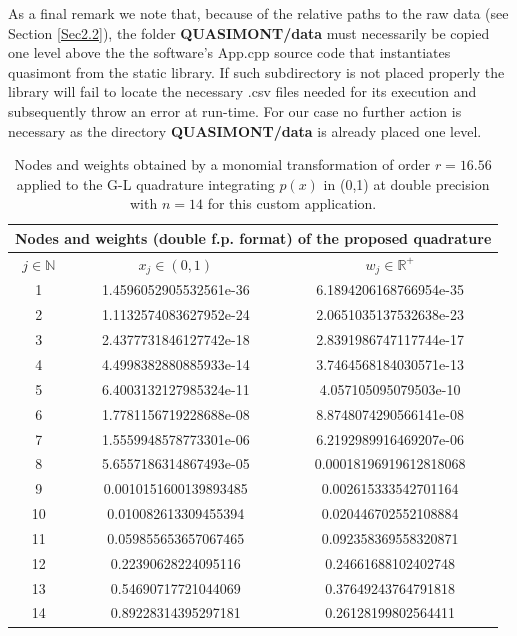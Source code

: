 \documentclass[a4paper, twosided]{book}
\begin{document}
\noindent
As a final remark we note that, because of the relative paths to the raw data (see Section \ref{Sec2.2}), the folder \colorbox{poliGrayBlue}{\textbf{QUASIMONT/data}} must necessarily be copied one level above the the software's \colorbox{poliGrayBlue}{App.cpp} source code that instantiates \colorbox{poliGrayBlue}{quasimont} from the static library. If such subdirectory is not placed properly the library will fail to locate the necessary \colorbox{poliGrayBlue}{.csv} files needed for its execution and subsequently throw an error at run-time. For our case no further action is necessary as the directory \colorbox{poliGrayBlue}{\textbf{QUASIMONT/data}} is already placed one level.

\begin{table}[H]
\centering
\begin{tabular}{|c||c|c|}
\hline
\multicolumn{3}{|c|}{\textbf{Nodes and weights (double f.p. format) of the proposed quadrature}} \\
\hline
$j\in\mathbb{N}$ & $x_j\in(0,1)$ & $w_j\in\mathbb{R}^+$ \\
\hline
1   &  1.4596052905532561e-36   &  6.1894206168766954e-35 \\
2   &  1.1132574083627952e-24   &  2.0651035137532638e-23 \\
3   &  2.4377731846127742e-18   &  2.8391986747117744e-17 \\ 
4   &  4.4998382880885933e-14   &  3.7464568184030571e-13 \\
5   &  6.4003132127985324e-11   &  4.057105095079503e-10  \\
6   &  1.7781156719228688e-08   &  8.8748074290566141e-08 \\
7   &  1.5559948578773301e-06   &  6.2192989916469207e-06 \\
8   &  5.6557186314867493e-05   &  0.00018196919612818068 \\
9   &  0.0010151600139893485    &  0.002615333542701164   \\
10   &  0.010082613309455394     &  0.020446702552108884   \\
11  &  0.059855653657067465     &  0.092358369558320871   \\
12  &  0.22390628224095116      &  0.24661688102402748    \\
13  &  0.54690717721044069      &  0.37649243764791818    \\
14  &  0.89228314395297181      &  0.26128199802564411    \\
\hline
\end{tabular}
  \caption{Nodes and weights obtained by a monomial transformation of order $r=16.56$ applied to the G-L quadrature integrating $p(x)$ in (0,1) at double precision with $n=14$ for this custom application.}
  \label{table3.1}
\end{table}
\end{document}
